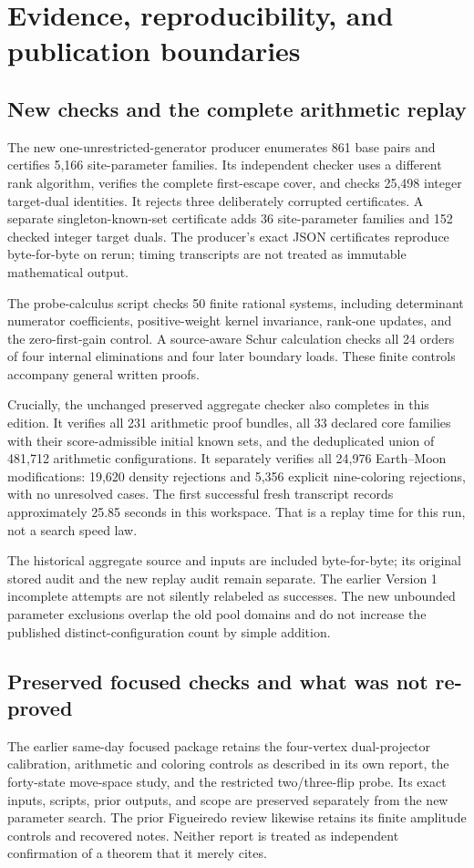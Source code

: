 \documentclass[11pt,letterpaper]{article}
\theoremstyle{definition}
\theoremstyle{remark}\newtheorem{remark}[theorem]{Remark}
\begin{document}
\section{Evidence, reproducibility, and publication boundaries}\label{sec:evidence}
\subsection{New checks and the complete arithmetic replay}
The new one-unrestricted-generator producer enumerates 861 base pairs and certifies 5,166 site-parameter families. Its independent checker uses a different rank algorithm, verifies the complete first-escape cover, and checks 25,498 integer target-dual identities. It rejects three deliberately corrupted certificates. A separate singleton-known-set certificate adds 36 site-parameter families and 152 checked integer target duals. The producer's exact JSON certificates reproduce byte-for-byte on rerun; timing transcripts are not treated as immutable mathematical output.

The probe-calculus script checks 50 finite rational systems, including determinant numerator coefficients, positive-weight kernel invariance, rank-one updates, and the zero-first-gain control. A source-aware Schur calculation checks all 24 orders of four internal eliminations and four later boundary loads. These finite controls accompany general written proofs.

Crucially, the unchanged preserved aggregate checker also completes in this edition. It verifies all 231 arithmetic proof bundles, all 33 declared core families with their score-admissible initial known sets, and the deduplicated union of 481,712 arithmetic configurations. It separately verifies all 24,976 Earth--Moon modifications: 19,620 density rejections and 5,356 explicit nine-coloring rejections, with no unresolved cases. The first successful fresh transcript records approximately 25.85 seconds in this workspace. That is a replay time for this run, not a search speed law.

The historical aggregate source and inputs are included byte-for-byte; its original stored audit and the new replay audit remain separate. The earlier Version 1 incomplete attempts are not silently relabeled as successes. The new unbounded parameter exclusions overlap the old pool domains and do not increase the published distinct-configuration count by simple addition.

\subsection{Preserved focused checks and what was not re-proved}
The earlier same-day focused package retains the four-vertex dual-projector calibration, arithmetic and coloring controls as described in its own report, the forty-state move-space study, and the restricted two/three-flip probe. Its exact inputs, scripts, prior outputs, and scope are preserved separately from the new parameter search. The prior Figueiredo review likewise retains its finite amplitude controls and recovered notes. Neither report is treated as independent confirmation of a theorem that it merely cites.
\end{document}
